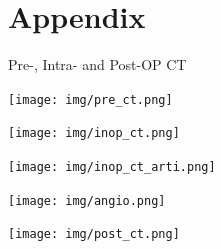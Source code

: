 \documentclass[10pt]{beamer}
\begin{document}
\section{Appendix}
\begin{frame}{Pre-, Intra- and Post-OP CT}
     \begin{center}
    \texttt{[image: img/pre\_ct.png]}
     \end{center}
     \framebreak

      \begin{center}
    \texttt{[image: img/inop\_ct.png]}
     \end{center}
     \framebreak

      \begin{center}
    \texttt{[image: img/inop\_ct\_arti.png]}
    \end{center}
    \framebreak

    \begin{center}
    \texttt{[image: img/angio.png]}
    \end{center}
    \framebreak

      \begin{center}
    \texttt{[image: img/post\_ct.png]}
     \end{center}
\end{frame}



 
\end{document}
